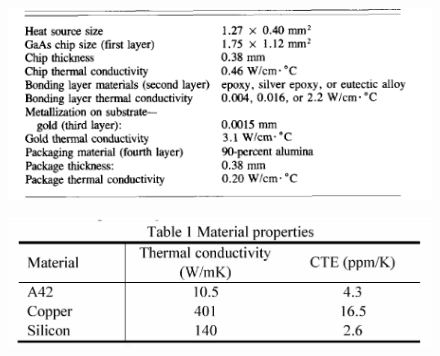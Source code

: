 \documentclass[final]{cubedoc}
\begin{document}
	\begin{figure}[h!]
		\centering
		\includegraphics[keepaspectratio, height=.25\textheight, width=\textwidth]{docs/package_properties_no3.png}
		\caption{\cite{49036}}
		\label{fig:tab_4}
	\end{figure}
	
	\begin{figure}[h!]
		\centering
		\includegraphics[keepaspectratio, height=.15\textheight, width=\textwidth]{docs/copper_plating_thickness.png}
		\caption{\cite{Li2012EffectsOC}}
		\label{}
	\end{figure}
	
	\clearpage
	
	
	
	
\end{document}

